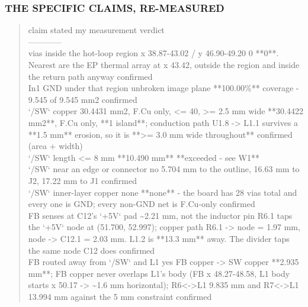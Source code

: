 \documentclass[11pt,a4paper]{article}
\begin{document}
\subsubsection*{THE SPECIFIC CLAIMS, RE-MEASURED}
\begin{quote}\small\ttfamily\raggedright
\textbar{} claim \textbar{} stated \textbar{} my measurement \textbar{} verdict \textbar{}\\
\textbar{}---\textbar{}---\textbar{}---\textbar{}---\textbar{}\\
\textbar{} vias inside the hot-loop region x 38.87-43.02 / y 46.90-49.20 \textbar{} 0 \textbar{} {*}{*}0{*}{*}. Nearest are the EP thermal array at x 43.42, outside the region and inside the return path anyway \textbar{} confirmed \textbar{}\\
\textbar{} In1 GND under that region \textbar{} unbroken image plane \textbar{} {*}{*}100.00\%{*}{*} coverage - 9.545 of 9.545 mm2 \textbar{} confirmed \textbar{}\\
\textbar{} `/SW` copper \textbar{} 30.4431 mm2, F.Cu only, \textless{}= 40, \textgreater{}= 2.5 mm wide \textbar{} {*}{*}30.4422 mm2{*}{*}, F.Cu only, {*}{*}1 island{*}{*}; conduction path U1.8 -\textgreater{} L1.1 survives a {*}{*}1.5 mm{*}{*} erosion, so it is {*}{*}\textgreater{}= 3.0 mm wide throughout{*}{*} \textbar{} confirmed (area + width) \textbar{}\\
\textbar{} `/SW` length \textbar{} \textless{}= 8 mm \textbar{} {*}{*}10.490 mm{*}{*} \textbar{} {*}{*}exceeded - see W1{*}{*} \textbar{}\\
\textbar{} `/SW` near an edge or connector \textbar{} no \textbar{} 5.704 mm to the outline, 16.63 mm to J2, 17.22 mm to J1 \textbar{} confirmed \textbar{}\\
\textbar{} `/SW` inner-layer copper \textbar{} none \textbar{} {*}{*}none{*}{*} - the board has 28 vias total and every one is GND; every non-GND net is F.Cu-only \textbar{} confirmed \textbar{}\\
\textbar{} FB senses at C12's `+5V` pad \textbar{} \textasciitilde{}2.21 mm, not the inductor pin \textbar{} R6.1 taps the `+5V` node at (51.700, 52.997); copper path R6.1 -\textgreater{} node = 1.97 mm, node -\textgreater{} C12.1 = 2.03 mm. L1.2 is {*}{*}13.3 mm{*}{*} away. The divider taps the same node C12 does \textbar{} confirmed \textbar{}\\
\textbar{} FB routed away from `/SW` and L1 \textbar{} yes \textbar{} FB copper -\textgreater{} SW copper {*}{*}2.935 mm{*}{*}; FB copper never overlaps L1's body (FB x 48.27-48.58, L1 body starts x 50.17 -\textgreater{} \textasciitilde{}1.6 mm horizontal); R6\textless{}-\textgreater{}L1 9.835 mm and R7\textless{}-\textgreater{}L1 13.994 mm against the 5 mm constraint \textbar{} confirmed \textbar{}\\

\end{quote}
\end{document}
